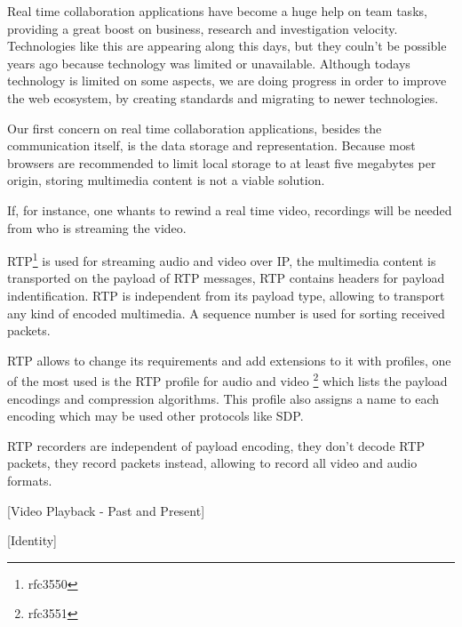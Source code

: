 
  Real time collaboration applications have become a huge help on team tasks, providing a great boost on business, research and investigation velocity. Technologies like this are appearing along this days, but they couln't be possible years ago because technology was limited or unavailable. Although todays technology is limited on some aspects, we are doing progress in order to improve the web ecosystem, by creating standards and migrating to newer technologies.

  Our first concern on real time collaboration applications, besides the communication itself, is the data storage and representation. Because most browsers are recommended to limit local storage to at least five megabytes per origin, storing multimedia content is not a viable solution.

  If, for instance, one whants to rewind a real time video, recordings will be needed from who is streaming the video. 

  \ac{RTP}\footnote{rfc3550} is used for streaming audio and video over \ac{IP}, the multimedia content is transported on the payload of \ac{RTP} messages, \ac{RTP} contains headers for payload indentification. \ac{RTP} is independent from its payload type, allowing to transport any kind of encoded multimedia. A sequence number is used for sorting received packets.

  \ac{RTP} allows to change its requirements and add extensions to it with profiles, one of the most used is the \ac{RTP} profile for audio and video \footnote{rfc3551} which lists the payload encodings and compression algorithms. This profile also assigns a name to each encoding which may be used other protocols like \ac{SDP}.

  \ac{RTP} recorders are independent of payload encoding, they don't decode \ac{RTP} packets, they record packets instead, allowing to record all video and audio formats.

  {\color{red}[Video Playback - Past and Present]}

  {\color{red}[Identity]}



